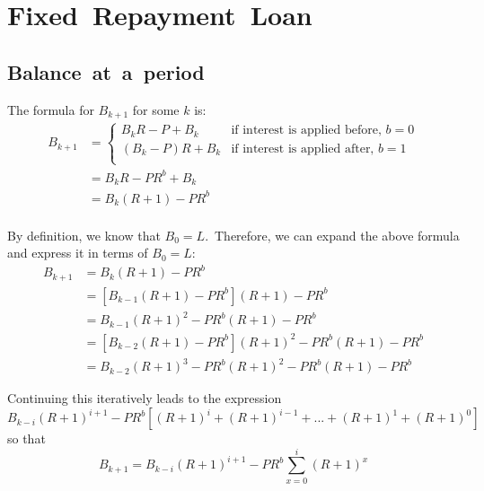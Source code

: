 
\section{Fixed~Repayment~Loan}\label{sec:fixed-repayment-loan}


\subsection{Balance~at~a~period}\label{subsec:frl-balance-at-n}

The formula for \(B_{k + 1}\) for some \(k\) is:
\begin{equation*}
    \begin{split}
        B_{k + 1} & = \begin{cases}
            B_{k}R - P + B_{k} & \text{if interest is applied before, $b = 0$}\\
            (B_{k} - P)R + B_{k} & \text{if interest is applied after, $b = 1$}\\
        \end{cases}\\
        & = B_{k}R - PR^{b} + B_{k}\\
        & = B_{k}(R + 1) - PR^{b}\\
    \end{split}
\end{equation*}

By definition, we know that \(B_{0} = L\).\ Therefore, we can expand the above formula and express it in terms of \(B_{0} = L\):
\begin{equation*}
    \begin{split}
        B_{k + 1} & = B_{k}(R + 1) - PR^{b}\\
        & = \left[ B_{k - 1}(R + 1) - PR^{b} \right](R + 1) - PR^{b}\\
        & = B_{k - 1}(R + 1)^{2} - PR^{b}(R + 1) - PR^{b}\\
        & = \left[ B_{k - 2}(R + 1) - PR^{b} \right](R + 1)^{2} - PR^{b}(R + 1) - PR^{b}\\
        & = B_{k - 2}(R + 1)^{3} - PR^{b}(R + 1)^{2} - PR^{b}(R + 1) - PR^{b}
    \end{split}
\end{equation*}

Continuing this iteratively leads to the expression
\begin{equation*}
    B_{k - i}(R + 1)^{i + 1} - PR^{b}\left[(R + 1)^{i} + (R + 1)^{i - 1} + ... + (R + 1)^{1} + (R + 1)^{0}\right]
\end{equation*}
so that
\begin{equation*}
    B_{k + 1} = B_{k - i}(R + 1)^{i + 1} - PR^{b}\sum_{x = 0}^{i}(R + 1)^{x}
\end{equation*}

